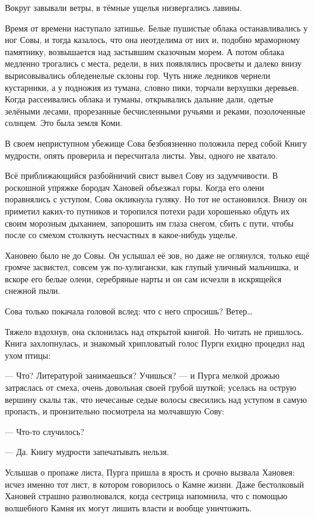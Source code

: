 \documentclass[12pt, a4paper, openany]{book}
\begin{document}
	Вокруг завывали ветры, в тёмные ущелья низвергались лавины.
	
	Время от времени наступало затишье. Белые пушистые облака останавливались у ног Совы, и тогда казалось, что она неотделима от них и, подобно мраморному памятнику, возвышается над застывшим сказочным морем. А потом облака медленно трогались с места, редели, в них появлялись просветы и далеко внизу вырисовывались обледенелые склоны гор. Чуть ниже ледников чернели кустарники, а у подножия из тумана, словно пики, торчали верхушки деревьев. Когда рассеивались облака и туманы, открывались дальние дали, одетые зелёными лесами, прорезанные бесчисленными ручьями и реками, позолоченные солнцем. Это была земля Коми.
	
	В своем неприступном убежище Сова безбоязненно положила перед собой Книгу мудрости, опять проверила и пересчитала листы. Увы, одного не хватало.
	
	Всё приближающийся разбойничий свист вывел Сову из задумчивости. В роскошной упряжке бородач Хановей объезжал горы. Когда его олени поравнялись с уступом, Сова окликнула гуляку. Но тот не остановился. Внизу он приметил каких-то путников и торопился потехи ради хорошенько обдуть их своим морозным дыханием, запорошить им глаза снегом, сбить с пути, чтобы после со смехом столкнуть несчастных в какое-нибудь ущелье.
	
	Хановею было не до Совы. Он услышал её зов, но даже не оглянулся, только ещё громче засвистел, совсем уж по-хулигански, как глупый уличный мальчишка, и вскоре его белые олени, серебряные нарты и он сам исчезли в искрящейся снежной пыли.
	
	Сова только покачала головой вслед: что с него спросишь? Ветер…
	
	Тяжело вздохнув, она склонилась над открытой книгой. Но читать не пришлось. Книга захлопнулась, и знакомый хрипловатый голос Пурги ехидно процедил над ухом птицы:
	
	— Что? Литературой занимаешься? Учишься? — и Пурга мелкой дрожью затряслась от смеха, очень довольная своей грубой шуткой; уселась на острую вершину скалы так, что нечесаные седые волосы свесились над уступом в самую пропасть, и пронзительно посмотрела на молчавшую Сову:
	
	— Что-то случилось?
	
	— Да. Книгу мудрости запечатывать нельзя.
	
	Услышав о пропаже листа, Пурга пришла в ярость и срочно вызвала Хановея: исчез именно тот лист, в котором говорилось о Камне жизни. Даже бестолковый Хановей страшно разволновался, когда сестрица напомнила, что с помощью волшебного Камня их могут лишить власти и вообще уничтожить.
	
\end{document}
